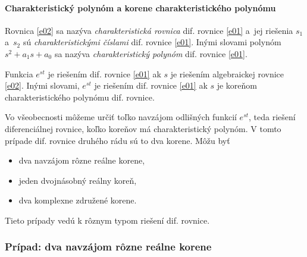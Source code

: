 \documentclass[a4paper, 10pt, ]{article}
\begin{document}
\paragraph{Charakteristický polynóm a korene charakteristického polynómu}

Rovnica \eqref{e02} sa nazýva \emph{charakteristická rovnica} dif. rovnice \eqref{e01} a~jej riešenia $s_1$ a~$s_2$ sú \emph{charakteristickými číslami} dif. rovnice \eqref{e01}. Inými slovami polynóm $s^2 + a_1 s + a_0$ sa nazýva \emph{charakteristický polynóm} dif. rovnice \eqref{e01}.

Funkcia $e^{s t}$ je riešením dif. rovnice \eqref{e01} ak $s$ je riešením algebraickej rovnice \eqref{e02}. Inými slovami, $e^{s t}$ je riešením dif. rovnice \eqref{e01} ak $s$ je koreňom charakteristického polynómu dif. rovnice. 


Vo všeobecnosti môžeme určiť toľko navzájom odlišných funkcií $e^{s t}$, teda riešení diferenciálnej rovnice, koľko koreňov má charakteristický polynóm. V tomto prípade dif. rovnice druhého rádu sú to dva korene. Môžu byť
\begin{itemize}
    \item dva navzájom rôzne reálne korene,
    \item jeden dvojnásobný reálny koreň,
    \item dva komplexne združené korene.
\end{itemize}
Tieto prípady vedú k rôznym typom riešení dif. rovnice.







\subsubsection{Prípad: dva navzájom rôzne reálne korene}
\end{document}
